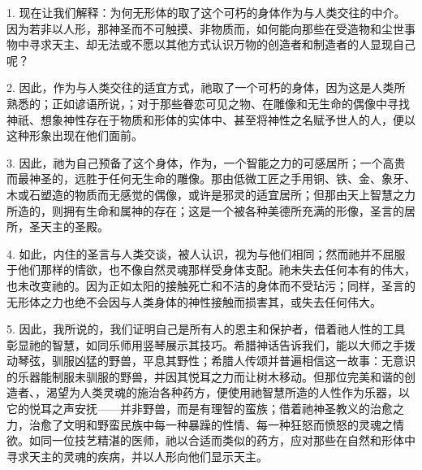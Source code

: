 1. 现在让我们解释：为何无形体的取了这个可朽的身体作为与人类交往的中介。因为若非以人形，那神圣而不可触摸、非物质而，如何能向那些在受造物和尘世事物中寻求天主、却无法或不愿以其他方式认识万物的创造者和制造者的人显现自己呢？\par

2. 因此，作为与人类交往的适宜方式，祂取了一个可朽的身体，因为这是人类所熟悉的；正如谚语所说，；对于那些眷恋可见之物、在雕像和无生命的偶像中寻找神祇、想象神性存在于物质和形体的实体中、甚至将神性之名赋予世人的人，便以这种形象出现在他们面前。\par

3. 因此，祂为自己预备了这个身体，作为，一个智能之力的可感居所；一个高贵而最神圣的，远胜于任何无生命的雕像。那由低微工匠之手用铜、铁、金、象牙、木或石塑造的物质而无感觉的偶像，或许是邪灵的适宜居所；但那由天上智慧之力所造的，则拥有生命和属神的存在；这是一个被各种美德所充满的形像，圣言的居所，圣天主的圣殿。\par

4. 如此，内住的圣言与人类交谈，被人认识，视为与他们相同；然而祂并不屈服于他们那样的情欲，也不像自然灵魂那样受身体支配。祂未失去任何本有的伟大，也未改变祂的。因为正如太阳的接触死亡和不洁的身体而不受玷污；同样，圣言的无形体之力也绝不会因与人类身体的神性接触而损害其，或失去任何伟大。\par

5. 因此，我所说的，我们证明自己是所有人的恩主和保护者，借着祂人性的工具彰显祂的智慧，如同乐师用竖琴展示其技巧。希腊神话告诉我们，能以大师之手拨动琴弦，驯服凶猛的野兽，平息其野性；希腊人传颂并普遍相信这一故事：无意识的乐器能制服未驯服的野兽，并因其悦耳之力而让树木移动。但那位完美和谐的创造者、，渴望为人类灵魂的施治各种药方，便使用祂智慧所造的人性作为乐器，以它的悦耳之声安抚——并非野兽，而是有理智的蛮族；借着祂神圣教义的治愈之力，治愈了文明和野蛮民族中每一种暴躁的性情、每一种狂怒而愤怒的灵魂之情欲。如同一位技艺精湛的医师，祂以合适而类似的药方，应对那些在自然和形体中寻求天主的灵魂的疾病，并以人形向他们显示天主。\par

